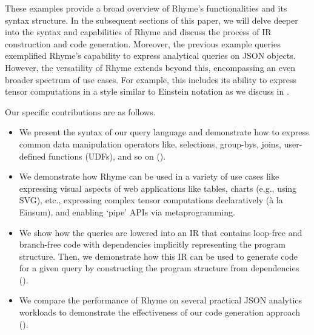 \documentclass[runningheads]{llncs}
\newcommand{\lang}{Rhyme}
\begin{document}
These examples provide a broad overview of \lang{}'s functionalities and its
syntax structure.
In the subsequent sections of this paper, we will delve deeper into the syntax and capabilities
of \lang{} and discuss the process of IR construction and code generation.
Moreover, the previous example queries exemplified \lang{}'s capability to
express analytical queries on JSON objects.
However, the versatility of \lang{} extends beyond this, encompassing an even broader
spectrum of use cases. 
For example, this includes its ability to 
express tensor computations in a style similar to
Einstein notation as we discuss in .

Our specific contributions are as follows.

\begin{itemize}
    \item We present the syntax of our query language and demonstrate how to express common
          data manipulation operators like, selections, group-bys, joins, user-defined functions (UDFs),
          and so on ().
    \item We demonstrate how \lang{} can be used in a variety of use cases like expressing visual aspects of
          web applications like tables, charts (e.g., using SVG), etc., expressing complex tensor computations
          declaratively (à la Einsum), and enabling `pipe' APIs via metaprogramming.
    \item We show how the queries are lowered into an IR that contains loop-free and branch-free code
          with dependencies implicitly representing the program structure.
          Then, we demonstrate how this IR can be used to generate code for a given query by constructing
          the program structure from dependencies ().
    \item We compare the performance of \lang{} on several practical JSON analytics workloads to demonstrate the
          effectiveness of our code generation approach ().
\end{itemize}
\end{document}
